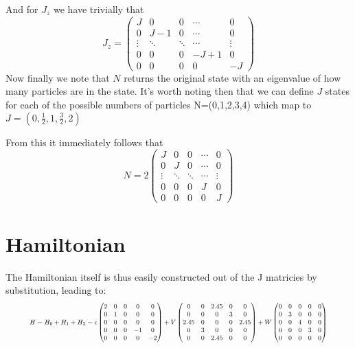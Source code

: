 \documentclass[11pt]{article} %
\begin{document}
And for $J_z$ we have trivially that\\

\begin{equation}
J_z=\begin{pmatrix} J & 0 & 0 & \cdots & 0 \\
0 & J-1  & 0 & \cdots & 0 \\
\vdots & \ddots  & \ddots  & \cdots & \vdots\\
0 & 0 & 0 & -J+1 & 0\\
0 & 0 & 0 & 0& -J 
 \end{pmatrix}
\end{equation}
Now finally we note that $N$ returns the original state with an eigenvalue of how many particles are in the state. It's worth noting then that we can define $J$ states for each of the possible numbers of particles N=(0,1,2,3,4) which map to $J=(0,\frac{1}{2},1,\frac{3}{2},2)$

  From this it immediately follows that\\

\begin{equation}
N=2\begin{pmatrix} 
J & 0 & 0 & \cdots & 0 \\
0 & J  & 0 & \cdots & 0 \\
\vdots & \ddots  & \ddots  & \cdots & \vdots\\
0 & 0 & 0 & J & 0\\
0 & 0 & 0 & 0& J \end{pmatrix}
\end{equation}

\section{Hamiltonian}

The Hamiltonian itself is thus easily constructed out of the J matricies by substitution, leading to:\\

\begin{equation}\resizebox{.9\hsize}{!}{$
H=H_0+H_1+H_2=\epsilon \begin{pmatrix}2 & 0 & 0 & 0 & 0 \\
0 & 1 & 0 & 0 & 0 \\
0 & 0 & 0 & 0 & 0 \\
0 & 0 & 0 & -1 & 0 \\
0 & 0 & 0 & 0 & -2
\end{pmatrix}+V \begin{pmatrix}0 & 0 & 2.45 & 0 & 0 \\
0 & 0 & 0 & 3 & 0 \\
2.45 & 0 & 0 & 0 & 2.45 \\
0 & 3 & 0 & 0 & 0 \\
0 & 0 & 2.45 & 0 & 0 \end{pmatrix}+W\begin{pmatrix}0 & 0 & 0 & 0 & 0 \\
0 & 3 & 0 & 0 & 0 \\
0 & 0 & 4 & 0 & 0 \\
0 & 0 & 0 & 3 & 0 \\
0 & 0 & 0 & 0 & 0\end{pmatrix}$}
\end{equation}
 
\end{document}
